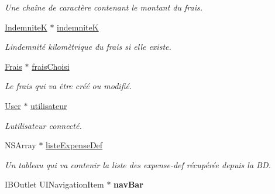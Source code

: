 \begin{DoxyCompactItemize}
\begin{DoxyCompactList}\small\item\em Une chaîne de caractère contenant le montant du frais. \end{DoxyCompactList}\item 
\hypertarget{interface_frais_table_view_controller_a9ba5a1442223405d6f3cd9238c44f3b9}{}\hyperlink{interface_indemnite_k}{Indemnite\+K} $\ast$ \hyperlink{interface_frais_table_view_controller_a9ba5a1442223405d6f3cd9238c44f3b9}{indemnite\+K}\label{interface_frais_table_view_controller_a9ba5a1442223405d6f3cd9238c44f3b9}

\begin{DoxyCompactList}\small\item\em L\textquotesingle{}indemnité kilomètrique du frais si elle existe. \end{DoxyCompactList}\item 
\hypertarget{interface_frais_table_view_controller_a3497c33fbbbb86a57f718102b926ead0}{}\hyperlink{interface_frais}{Frais} $\ast$ \hyperlink{interface_frais_table_view_controller_a3497c33fbbbb86a57f718102b926ead0}{frais\+Choisi}\label{interface_frais_table_view_controller_a3497c33fbbbb86a57f718102b926ead0}

\begin{DoxyCompactList}\small\item\em Le frais qui va être créé ou modifié. \end{DoxyCompactList}\item 
\hypertarget{interface_frais_table_view_controller_a42b5274fc3e34b65e3a20ed1786d192c}{}\hyperlink{interface_user}{User} $\ast$ \hyperlink{interface_frais_table_view_controller_a42b5274fc3e34b65e3a20ed1786d192c}{utilisateur}\label{interface_frais_table_view_controller_a42b5274fc3e34b65e3a20ed1786d192c}

\begin{DoxyCompactList}\small\item\em L\textquotesingle{}utilisateur connecté. \end{DoxyCompactList}\item 
\hypertarget{interface_frais_table_view_controller_a31481e8ca9a4d1390a8c7958dbd92e66}{}N\+S\+Array $\ast$ \hyperlink{interface_frais_table_view_controller_a31481e8ca9a4d1390a8c7958dbd92e66}{liste\+Expense\+Def}\label{interface_frais_table_view_controller_a31481e8ca9a4d1390a8c7958dbd92e66}

\begin{DoxyCompactList}\small\item\em Un tableau qui va contenir la liste des expense-\/def récupérée depuis la B\+D. \end{DoxyCompactList}\item 
\hypertarget{interface_frais_table_view_controller_a4a9ca8bd973d213593dc130d48d80d11}{}I\+B\+Outlet U\+I\+Navigation\+Item $\ast$ {\bfseries nav\+Bar}\label{interface_frais_table_view_controller_a4a9ca8bd973d213593dc130d48d80d11}


\end{DoxyCompactItemize}
